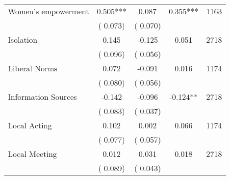 \begin{tabular}{l*{4}{c}}
 Women's empowerment                       &              0.505*** &         0.087            &              0.355***     & 1163                             \\  
                                       &          (       0.073)               &        (       0.070)                                &                                               &                                               \\      

 Isolation                       &              0.145 &        -0.125            &              0.051     & 2718                             \\  
                                       &          (       0.096)               &        (       0.056)                                &                                               &                                               \\      

 Liberal Norms                       &              0.072 &        -0.091            &              0.016     & 1174                             \\  
                                       &          (       0.080)               &        (       0.056)                                &                                               &                                               \\      

 Information Sources                       &             -0.142 &        -0.096            &             -0.124**     & 2718                             \\  
                                       &          (       0.083)               &        (       0.037)                                &                                               &                                               \\      

 Local Acting                       &              0.102 &         0.002            &              0.066     & 1174                             \\  
                                       &          (       0.077)               &        (       0.057)                                &                                               &                                               \\      

 Local Meeting                       &              0.012 &         0.031            &              0.018     & 2718                             \\  
                                       &          (       0.089)               &        (       0.043)                                &                                               &                                               \\      


\end{tabular}
